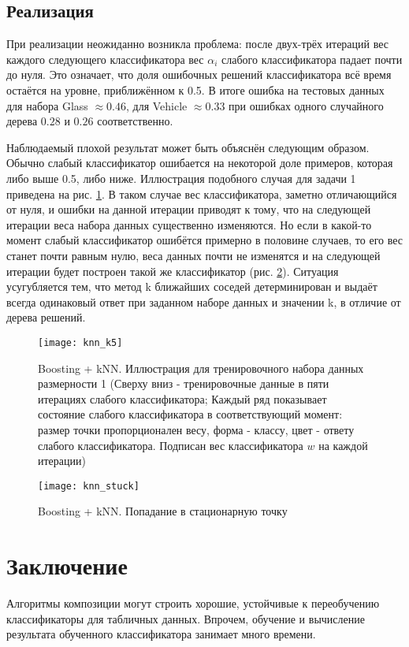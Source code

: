 \documentclass[a4paper,12pt]{article} %
\newcommand{\myPictWidth}{.95\textwidth}
\begin{document}
\subsection{Реализация}
При реализации неожиданно возникла проблема: после двух-трёх итераций вес каждого следующего классификатора вес $\alpha_i$ слабого классификатора падает почти до нуля. Это означает, что доля ошибочных решений классификатора всё время остаётся на уровне, приближённом к 0.5. В итоге ошибка на тестовых данных для набора Glass $\approx 0.46$, для Vehicle $\approx 0.33$ при ошибках одного случайного дерева $0.28$ и $0.26$ соответственно.

Наблюдаемый плохой результат может быть объяснён следующим образом. Обычно слабый классификатор ошибается на некоторой доле примеров, которая либо выше 0.5, либо ниже. Иллюстрация подобного случая для задачи 1 приведена на рис. \ref{fig:boosting_k2}. В таком случае вес классификатора, заметно отличающийся от нуля, и ошибки на данной итерации приводят к тому, что на следующей итерации веса набора данных существенно изменяются. Но если в какой-то момент слабый классификатор ошибётся примерно в половине случаев, то его вес станет почти равным нулю, веса данных почти не изменятся и на следующей итерации будет построен такой же классификатор (рис. \ref{fig:boosting_stuck}). Ситуация усугубляется тем, что метод k ближайших соседей детерминирован и выдаёт всегда одинаковый ответ при заданном наборе данных и значении k, в отличие от дерева решений.

\begin{figure}[H]
	\centering \texttt{[image: knn\_k5]}
	\caption{Boosting + kNN. Иллюстрация для тренировочного набора данных размерности 1 (Сверху вниз - тренировочные данные в пяти итерациях слабого классификатора; Каждый ряд показывает состояние слабого классификатора в соответствующий момент: размер точки пропорционален весу, форма - классу, цвет - ответу слабого классификатора. Подписан вес классификатора $w$ на каждой итерации)}
	\label{fig:boosting_k2}
\end{figure}

\begin{figure}[H]
	\centering \texttt{[image: knn\_stuck]}
	\caption{Boosting + kNN. Попадание в стационарную точку}
	\label{fig:boosting_stuck}
\end{figure}

\section{Заключение}
Алгоритмы композиции могут строить хорошие, устойчивые к переобучению классификаторы для табличных данных. Впрочем, обучение и вычисление результата обученного классификатора занимает много времени.
\end{document}

